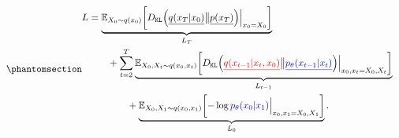 \documentclass[
]{article}
\theoremstyle{remark}
\begin{document}
\begin{equation}\phantomsection\label{eq-decom-L}{
\begin{aligned}
  L 
  &= \underbrace{\mathbb E_{X_0\sim q(x_0)} \biggl[ D_{\mathtt{KL}} \Bigl( \underline{q(x_T \vert x_0)} \big\Vert \underline{p(x_T)} \Bigr) \Big\vert_{x_0=X_0} \biggr]}_{L_T} \cr 
  & \qquad + \sum_{t=2}^T 
  \underbrace{\mathbb E_{X_0,X_t\sim q(x_0,x_{t})} \biggl[ 
    D_{\mathtt{KL}} \Bigl( 
            {\underline{\color{red}{q(x_{t-1} \vert x_t,x_0)}}}
            \big\Vert 
            \underline{\color{blue}{p_{\theta}(x_{t-1}\vert x_t)} }
            \Bigr)\Big \vert_{x_0,x_t=X_0,X_t} 
    \biggr]}_{L_{t-1}}  \cr 
    & \qquad \qquad + \underbrace{\mathbb E_{X_0,X_1\sim q(x_0,x_1)} \biggl[ 
      -\log {\color{blue}{p_{\theta}(x_0 \vert x_1)}} \Big\vert_{x_0,x_1=X_0,X_1}
      \biggr]}_{L_0}.
\end{aligned}
}\end{equation}
\end{document}
